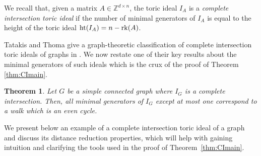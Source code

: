 \documentclass[a4paper, 12pt]{article}
\newcommand{\ZZ}{\mathbb Z}
\theoremstyle{plain}
\newtheorem{theorem}{Theorem}[section]
\theoremstyle{definition}
\theoremstyle{remark}
\begin{document}
We recall that, given a matrix $A \in \ZZ^{d \times n}$, the toric ideal $I_A$ is a \textit{complete intersection toric ideal} if the number of minimal generators of $I_A$ is equal to the height of the toric ideal ${\rm ht}(I_A) = n - {\rm rk}(A)$. 

Tatakis and Thoma give a graph-theoretic classification of complete intersection toric ideals of graphs in \cite{tatakis2011completeintersectiontoricideals}. We now restate one of their key results about the minimal generators of such ideals which is the crux of the proof of Theorem \ref{thm:CImain}.

\begin{theorem} \cite[Theorem 5.4]{tatakis2011completeintersectiontoricideals} \label{thm:tatakisCI}
    Let $G$ be a simple connected graph where $I_G$ is a complete intersection. Then, all minimal generators of $I_G$ except at most one correspond to a walk which is an even cycle.
\end{theorem}


We present  below an example of a complete intersection toric ideal of a graph and discuss its distance reduction properties, which will help with gaining intuition and clarifying the tools used in the proof of Theorem~\ref{thm:CImain}.
\end{document}
